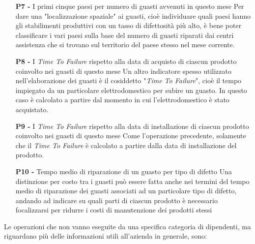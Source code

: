 \documentclass[a4paper, 12pt]{report}
\begin{document}
\begin{itemize}
	\item[\textbf{P7 -}] I primi cinque paesi per numero di guasti avvenuti in questo mese
		\subitem Per dare una "localizzazione spaziale" ai guasti, cioè individuare quali paesi hanno gli stabilimenti produttivi con un tasso di difettosità più alto, è bene
		poter classificare i vari paesi sulla base del numero di guasti riparati dai centri assistenza che si trovano sul territorio del paese stesso nel mese corrente.
	\item[\textbf{P8 -}] I \textit{Time To Failure} rispetto alla data di acquisto di ciascun prodotto coinvolto nei guasti di questo mese
		\subitem Un altro indicatore spesso utilizzato nell'elaborazione dei guasti è il cosiddetto "\textit{Time To Failure}", cioè il tempo impiegato da un particolare elettrodomestico
		per subire un guasto. In questo caso è calcolato a partire dal momento in cui l'elettrodomestico è stato acquistato.
	\item[\textbf{P9 -}] I \textit{Time To Failure} rispetto alla data di installazione di ciascun prodotto coinvolto nei guasti di questo mese
		\subitem Come l'operazione precedente, solamente che il \textit{Time To Failure} è calcolato a partire dalla data di installazione del prodotto.
	\item[\textbf{P10 -}] Tempo medio di riparazione di un guasto per tipo di difetto
		\subitem Una distinzione per costo tra i guasti può essere fatta anche nei termini del tempo medio di riparazione dei guasti associati ad un particolare tipo di difetto,
		andando ad indicare su quali parti di ciascun prodotto è necessario focalizzarsi per ridurre i costi di manutenzione dei prodotti stessi
\end{itemize}

Le operazioni che non vanno eseguite da una specifica categoria di dipendenti, ma riguardano più delle informazioni utili all'azienda in generale, sono:
\end{document}
